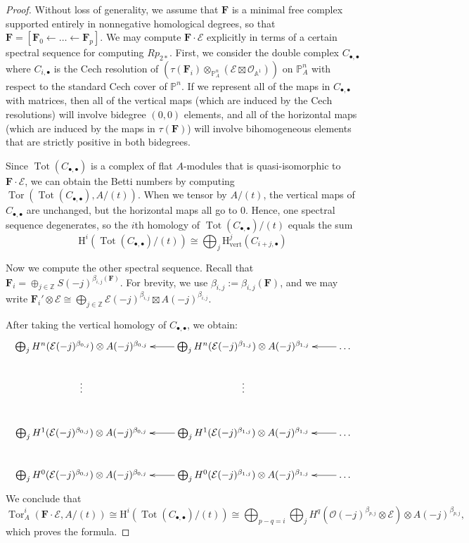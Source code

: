 \documentclass[12pt]{amsart}
\theoremstyle{definition}
\theoremstyle{remark}
\newcommand{\Tor}{\operatorname{Tor}}
\newcommand{\Tot}{\operatorname{Tot}}
\newcommand{\PP}{\mathbb{P}}
\renewcommand{\AA}{\mathbb{A}}
\newcommand{\HH}{\mathrm{H}}
\newcommand{\ZZ}{\mathbb{Z}}
\newcommand{\cO}{\mathcal{O}}
\newcommand{\cE}{\mathcal{E}}
\newcommand{\FF}{\mathbf{F}}
\begin{document}
\begin{proof}
Without loss of generality, we assume that $\FF$ is a minimal free complex supported entirely in nonnegative homological degrees, so that $\FF=[\FF_0\gets \dots \gets \FF_p]$.  
We may compute $\FF\cdot \cE$ explicitly in terms of a certain spectral sequence for computing $Rp_{2*}$.  First, we consider the double complex $C_{\bullet, \bullet}$ where $C_{i,\bullet}$ is the Cech resolution of $\left( \tau(\FF_i)\otimes_{\PP^n_A} (\cE\boxtimes \cO_{\AA^1})\right)$ on $\PP^n_A$ with respect to the standard Cech cover of $\mathbb P^n$.  If we represent all of the maps in $C_{\bullet, \bullet}$ with matrices, then all of the vertical maps (which are induced by the Cech resolutions) will involve bidegree $(0,0)$ elements, and all of the horizontal maps (which are induced by the maps in $\tau(\FF)$) will involve bihomogeneous elements that are strictly positive in both bidegrees.

Since $\Tot(C_{\bullet, \bullet})$ is a complex of flat $A$-modules that is quasi-isomorphic to $\FF\cdot \cE$, we can obtain the Betti numbers by computing $\Tor(\Tot(C_{\bullet, \bullet}), A/(t))$.  When we tensor by $A/(t)$, the vertical maps of $C_{\bullet, \bullet}$ are unchanged, but the horizontal maps all go to $0$.  
Hence, one spectral sequence degenerates, so the $i$th homology of $\Tot(C_{\bullet,\bullet})/(t)$ equals the sum 
\[
\HH^i(\Tot(C_{\bullet,\bullet})/(t))\cong \bigoplus_{j} \HH^j_{\text{vert}}(C_{i+j,\bullet})
\]

Now we compute the other spectral sequence.
Recall that $\FF_i=\oplus_{j\in \ZZ} S(-j)^{\beta_{i,j}(\FF)}$.  For brevity, we use $\beta_{i,j}:=\beta_{i,j}(\FF)$, and we may write $\FF_i'\otimes \cE\cong \bigoplus_{j\in \ZZ} \cE(-j)^{\beta_{i,j}}\boxtimes A(-j)^{\beta_{i,j}}$.

After taking the vertical homology of $C_{\bullet, \bullet}$, we obtain:
\[
\xymatrix{
\bigoplus_{j} H^n(\cE(-j)^{\beta_{0,j}})\otimes A(-j)^{\beta_{0,j}}&\bigoplus_{j} H^n(\cE(-j)^{\beta_{1,j}})\otimes A(-j)^{\beta_{1,j}}\ar[l]&\dots\ar[l]\\
\vdots & \vdots&\\
\bigoplus_{j} H^1(\cE(-j)^{\beta_{0,j}})\otimes A(-j)^{\beta_{0,j}}&\bigoplus_{j} H^1(\cE(-j)^{\beta_{1,j}})\otimes A(-j)^{\beta_{1,j}}\ar[l]&\dots\ar[l]\\
\bigoplus_{j} H^0( \cE(-j)^{\beta_{0,j}})\otimes A(-j)^{\beta_{0,j}}&\bigoplus_{j} H^0(\cE(-j)^{\beta_{1,j}})\otimes A(-j)^{\beta_{1,j}}\ar[l]&\dots\ar[l]
}
\]
We conclude that
\[
\Tor^i_A(\FF\cdot \cE, A/(t))\cong \HH^i(\Tot(C_{\bullet,\bullet})/(t))\cong \bigoplus_{p-q=i} \bigoplus_{j} H^q(\cO(-j)^{\beta_{p,j}}\otimes \cE)\otimes A(-j)^{\beta_{p,j}},
\]
which proves the formula.
\end{proof}
\end{document}
